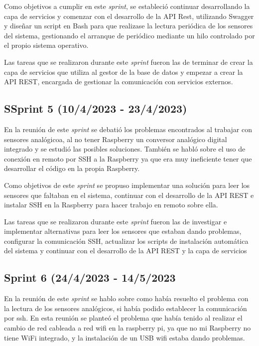 Como objetivos a cumplir en este \textit{sprint}, se estableció continuar desarrollando la capa de servicios y comenzar con el desarrollo de la API Rest, utilizando Swagger y diseñar un script en Bash para que realizase la lectura periódica de los sensores del sistema, gestionando el arranque de periódico mediante un hilo controlado por el propio sistema operativo.

Las tareas que se realizaron durante este \textit{sprint} fueron las de terminar de crear la capa de servicios que utiliza al gestor de la base de datos y empezar a crear la API REST, encargada de gestionar la comunicación con servicios externos. 

\subsection{SSprint 5 (10/4/2023 - 23/4/2023)}
En la reunión de este \textit{sprint} se debatió los problemas encontrados al trabajar con sensores analógicoa, al no tener Raspberry un conversor analógico digital integrado y se estudió las posibles soluciones. También se habló sobre el uso de conexión en remoto por SSH a la Raspberry ya que era muy ineficiente tener que desarrollar el código en la propia Raspberry.

Como objetivos de este \textit{sprint} se propuso implementar una solución para leer los sensores que faltaban en el sistema, continuar con el desarrollo de la API REST e instalar SSH en la Raspberry para hacer trabajo en remoto sobre ella.

Las tareas que se realizaron durante este \textit{sprint} fueron las de investigar e implementar alternativas para leer los sensores que estaban dando problemas, configurar la comunicación SSH, actualizar los scripts de instalación automática del sistema y continuar con el desarrollo de la API REST y la capa de servicios

\subsection{Sprint 6 (24/4/2023 - 14/5/2023}
En la reunión de este \textit{sprint} se hablo sobre como había resuelto el problema con la lectura de los sensores analógicos, si había podido establecer la comunicación por ssh. En esta reunión se planteó el problema que había tenido al realizar el cambio de red cableada a red wifi en la raspberry pi, ya que no mi Raspberry no tiene WiFi integrado, y la instalación de un USB wifi estaba dando problemas.

